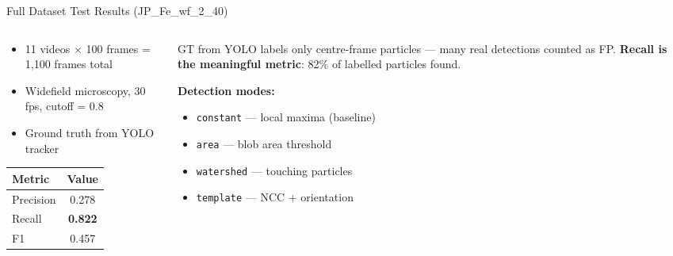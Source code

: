 \begin{frame}{Full Dataset Test Results (JP\_Fe\_wf\_2\_40)}
\begin{columns}
\begin{column}{0.50\textwidth}
\begin{itemize}\small
    \item 11 videos $\times$ 100 frames = 1{,}100 frames total
    \item Widefield microscopy, 30 fps, cutoff = 0.8
    \item Ground truth from YOLO tracker
\end{itemize}
\begin{center}
\small\begin{tabular}{|l|c|}
\hline
\textbf{Metric} & \textbf{Value} \\
\hline
Precision & 0.278 \\
\hline
Recall    & \textbf{0.822} \\
\hline
F1        & 0.457 \\
\hline
\end{tabular}
\end{center}
\end{column}
\begin{column}{0.50\textwidth}
\begin{myalert}
\footnotesize GT from YOLO labels only centre-frame particles — many real detections counted as FP. \textbf{Recall is the meaningful metric}: 82\% of labelled particles found.
\end{myalert}
\smallskip
\textbf{Detection modes:}
\begin{itemize}\small
    \item \texttt{constant} — local maxima (baseline)
    \item \texttt{area} — blob area threshold
    \item \texttt{watershed} — touching particles
    \item \texttt{template} — NCC + orientation
\end{itemize}
\end{column}
\end{columns}
\end{frame}
